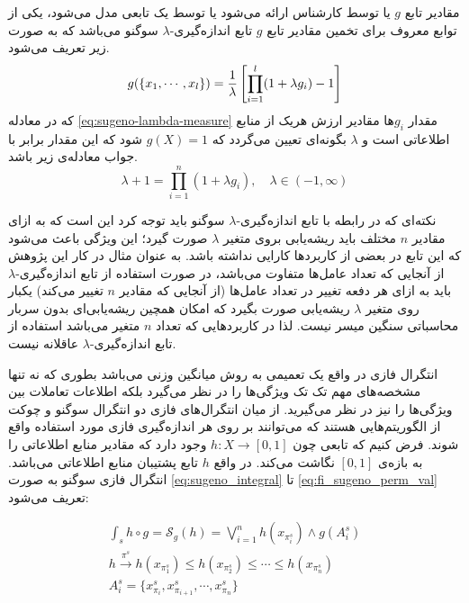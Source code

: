 مقادیر تابع $g$ یا توسط کارشناس ارائه می‌شود یا توسط یک تابعی مدل می‌شود، یکی از توابع معروف برای تخمین مقادیر تابع $g$ تابع اندازه‌گیری-$\lambda$ سوگنو می‌باشد که به صورت زیر تعریف می‌شود.
\begin{equation}\label{eq:sugeno-lambda-measure}
g(\{x_1,\cdots,x_l\}) = {1 \over \lambda}\left[\prod_{i=1}^l(1 + \lambda g_i) - 1\right]
\end{equation}
که در معادله \ref{eq:sugeno-lambda-measure} مقدار $g_i$ها مقادیر ارزش هریک از منابع اطلاعاتی است و $\lambda$ بگونه‌ای تعیین می‌گردد که $g(X) = 1$ شود که این مقدار برابر با جواب معادله‌ی زیر باشد.
\begin{equation}\label{eq:sugeno-lambda-measure:rooting}
\lambda + 1 = \prod_{i=1}^{n} (1 + \lambda g_i), \hspace{1em} \lambda \in (-1, \infty) 
\end{equation}

نکته‌ای که در رابطه با تابع اندازه‌گیری-$\lambda$ سوگنو باید توجه کرد این است که به ازای مقادیر $n$ مختلف باید ریشه‌یابی بروی متغیر $\lambda$ صورت گیرد؛ این ویژگی‌ باعث می‌شود که این تابع در بعضی از کاربردها کارایی نداشته باشد. به عنوان مثال در کار این پژوهش از آنجایی که تعداد عامل‌ها متفاوت می‌باشد، در صورت استفاده از تابع اندازه‌گیری-$\lambda$ باید به ازای هر دفعه تغییر در تعداد عامل‌ها (از آنجایی که مقادیر $n$ تغییر می‌کند) یکبار روی متغیر $\lambda$ ریشه‌یابی صورت بگیرد که امکان همچین ریشه‌یابی‌‌ای بدون سربار محاسباتی سنگین میسر نیست. لذا در کاربردهایی که تعداد $n$ متغیر می‌باشد استفاده از تابع اندازه‌گیری-$\lambda$ عاقلانه‌ نیست.

انتگرال فازی در واقع یک تعمیمی به روش میانگین وزنی می‌باشد بطوری که نه تنها مشخصه‌های مهم تک تک ویژگی‌ها را در نظر می‌گیرد بلکه اطلاعات تعاملات بین ویژگی‌ها را نیز در نظر می‌گیرید. از میان انتگرال‌های فازی دو انتگرال سوگنو و چوکت از الگوریتم‌هایی هستند که می‌توانند بر روی هر اندازه‌گیری‌ فازی مورد استفاده واقع شوند. فرض کنیم که تابعی چون
$h : X \rightarrow [0, 1]$
وجود دارد که مقادیر منابع اطلاعاتی را به بازه‌ی $[0,1]$ نگاشت می‌کند. در واقع $h$ تابع پشتیبان منابع اطلاعاتی می‌باشد. انتگرال فازی سوگنو به صورت
\ref{eq:sugeno_integral} تا \ref{eq:fi_sugeno_perm_val}
تعریف می‌شود:

\begin{eqnarray}
\int_{s} h \circ g = \mathcal{S}_g(h) = \bigvee_{i=1}^{n} h(x_{\pi_i^s}) \wedge g(A_i^s)\label{eq:sugeno_integral}\\
h \xrightarrow{\pi^s} h(x_{\pi_1^s}) \leq h(x_{\pi_2^s}) \leq \cdots \leq h(x_{\pi_n^s})\label{eq:fi_sugeno_perm_op}\\
A_i^s = \{x_{\pi_i}^s, x_{\pi_{i+1}}^s, \cdots, x_{\pi_n}^s\}\label{eq:fi_sugeno_perm_val}
\end{eqnarray}

